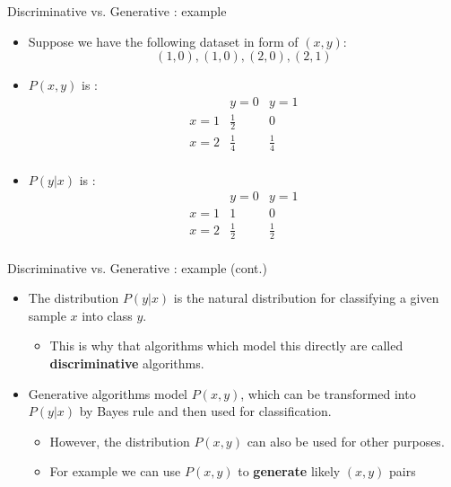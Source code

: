 \documentclass[serif, aspectratio=169]{beamer}
\begin{document}
\begin{frame}{Discriminative vs. Generative : example}
    \begin{itemize}
        \item Suppose we have the following dataset in form of $(x, y)$:
            \[
                (1,0), (1,0), (2,0), (2,1)
            \]
        \item $P(x,y)$ is :
            \[
            \begin{array}{c|cc}
                & y=0 & y=1 \\
                \hline
            x=1 & \frac{1}{2} & 0 \\
            x=2 & \frac{1}{4} & \frac{1}{4} \\
            \end{array}
            \]
        \item $P(y|x)$ is :
            \[
            \begin{array}{c|cc}
                & y=0 & y=1 \\
                \hline
            x=1 & 1 & 0 \\
            x=2 & \frac{1}{2} & \frac{1}{2} \\
            \end{array}
            \]
    \end{itemize}
\end{frame}


\begin{frame}{Discriminative vs. Generative : example (cont.)}
    \begin{itemize}
        \item The distribution $P(y|x)$ is the natural distribution for classifying a given sample $x$ into class $y$.
            \begin{itemize}
                \item This is why that algorithms which model this directly are called \textbf{discriminative} algorithms.
            \end{itemize}
        \item Generative algorithms model $P(x,y)$, which can be transformed into $P(y|x)$ by Bayes rule and then used for classification.
            \begin{itemize}
                \item However, the distribution $P(x,y)$ can also be used for other purposes.
                \item For example we can use $P(x,y)$ to \textbf{generate} likely $(x,y)$ pairs
            \end{itemize}
    \end{itemize}
\end{frame}
\end{document}

